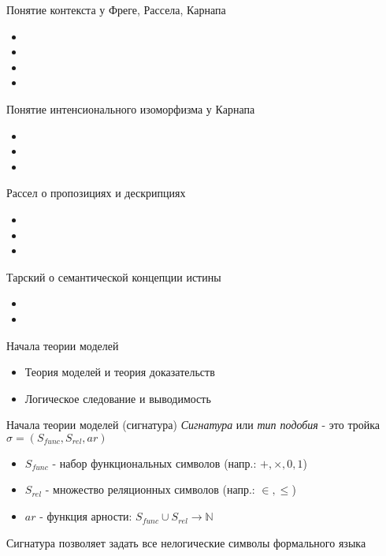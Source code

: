 \documentclass{beamer}
\begin{document}
\begin{frame}{Понятие контекста у Фреге, Рассела, Карнапа}
  \begin{itemize}
    \item 
    \item 
    \item 
    \item 
  \end{itemize}
\end{frame}

\begin{frame}{Понятие интенсионального изоморфизма у Карнапа}
  \begin{itemize}
    \item 
    \item 
    \item 
  \end{itemize}
\end{frame}

\begin{frame}{Рассел о пропозициях и дескрипциях}
  \begin{itemize}
    \item 
    \item 
    \item 
  \end{itemize}
\end{frame}

\begin{frame}{Тарский о семантической концепции истины}
  \begin{itemize}
    \item 
    \item 
  \end{itemize}
\end{frame}

\begin{frame}{Начала теории моделей}
  \begin{itemize}
    \item Теория моделей и теория доказательств
    \item Логическое следование и выводимость
  \end{itemize}
\end{frame}

\begin{frame}{Начала теории моделей (сигнатура)}
  \textit{Сигнатура} или \textit{тип подобия} - это тройка $\sigma = (S_{func}, S_{rel}, ar)$\\
  \bigskip
  \begin{itemize}
    \item $S_{func}$ - набор функциональных символов (напр.: $+, \times, 0, 1$)
    \item $S_{rel}$ - множество реляционных символов (напр.: $\in, \leq$)
    \item $ar$ - функция арности: $S_{func} \cup S_{rel} \to \mathbb{N}$
  \end{itemize}
  \bigskip
  Сигнатура позволяет задать все нелогические символы формального языка
\end{frame}
\end{document}
